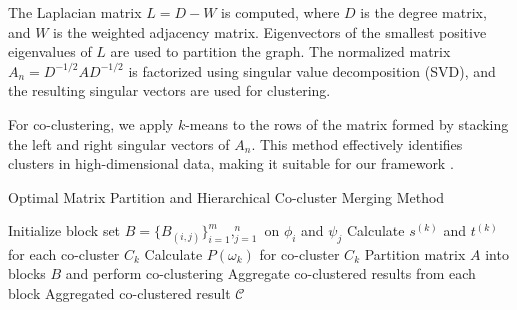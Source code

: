 The Laplacian matrix $L = D - W$ is computed, where $D$ is the degree matrix, and $W$ is the weighted adjacency matrix. Eigenvectors of the smallest positive eigenvalues of $L$ are used to partition the graph. The normalized matrix $A_n = D^{-1/2} A D^{-1/2}$ is factorized using singular value decomposition (SVD), and the resulting singular vectors are used for clustering.

For co-clustering, we apply $k$-means to the rows of the matrix formed by stacking the left and right singular vectors of $A_n$. This method effectively identifies clusters in high-dimensional data, making it suitable for our framework \cite{dhillon2001CoclusteringDocumentsWords}.

\begin{algorithm}[ht]
    \caption{Optimal Matrix Partition and Hierarchical Co-cluster Merging Method}\label{alg:method}
    \begin{algorithmic}[1]
        \STATE Initialize block set $B = \{B_{(i,j)}\}_{i=1}^m,_{j=1}^n$ on $\phi_i$ and $\psi_j$
        \STATE Calculate $s^{(k)}$ and $t^{(k)}$ for each co-cluster $C_k$
        \STATE Calculate $P(\omega_k)$ for co-cluster $C_k$
        \STATE Partition matrix $A$ into blocks $B$ and perform co-clustering
        \STATE Aggregate co-clustered results from each block
        \ENDIF
        \ENDFOR
        \RETURN Aggregated co-clustered result $\mathcal{C}$
    \end{algorithmic}
\end{algorithm}

